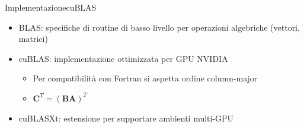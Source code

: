 \documentclass{beamer}
\begin{document}
\begin{frame}{Implementazione}{cuBLAS}
    \begin{itemize}
        \item BLAS: specifiche di routine di basso livello per operazioni algebriche (vettori, matrici)
        \item cuBLAS: implementazione ottimizzata per GPU NVIDIA
              \begin{itemize}
                  \item Per compatibilità con Fortran si aspetta ordine column-major
                  \item $\mathbf{C}^T=(\mathbf{B}\mathbf{A})^T$
              \end{itemize}
        \item \color{red} cuBLASXt: estensione per supportare ambienti multi-GPU
    \end{itemize}
\end{frame}
\end{document}

